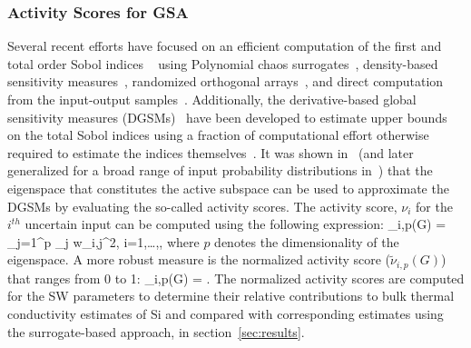 \subsubsection{Activity Scores for GSA}
\label{subsub:gsa_as}
Several recent efforts have
focused on an efficient computation of the first and total order Sobol indices
~\cite{Sudret:2008,Plischke:2013,Tissot:2015,Li:2016} using
Polynomial chaos surrogates~\cite{Sudret:2008}, density-based sensitivity measures~\cite{Plischke:2013},
 randomized orthogonal arrays~\cite{Tissot:2015}, and direct computation from the input-output 
 samples~\cite{Li:2016}. Additionally,
the derivative-based global sensitivity measures (DGSMs)~\cite{Sobol:2009, Lamboni:2013}
have been developed to estimate upper bounds on the total Sobol indices using a fraction of computational effort
otherwise required to estimate the indices themselves~\cite{Vohra:2018b}. It was shown 
in~\cite{Diaz:2016,Constantine:2017} (and later generalized for a broad range of input probability distributions 
in~\cite{Vohra:2018c}) that the eigenspace that constitutes the active subspace can be used to
approximate the DGSMs by evaluating the so-called activity scores. The activity score, $\nu_i$ for the 
$i^{th}$ uncertain input can be computed using the following expression:
%
\be
\nu_{i,p}(G) = \sum\limits_{j=1}^{p} \lambda_j w_{i,j}^2, i=1,\ldots,\Nt,
\label{eq:ac}
\ee
%
where $p$ denotes the dimensionality of the eigenspace. 
A more robust measure is the normalized activity score ($\tilde{\nu}_{i,p}(G)$) that ranges from 0 to 1:
%
\be
\tilde{\nu}_{i,p}(G) = .
\label{eq:nac}
\ee
%
The normalized activity scores are computed for the SW parameters to determine their relative contributions
to bulk thermal conductivity estimates of Si and compared with corresponding estimates using the surrogate-based
approach, in section~\ref{sec:results}. 


